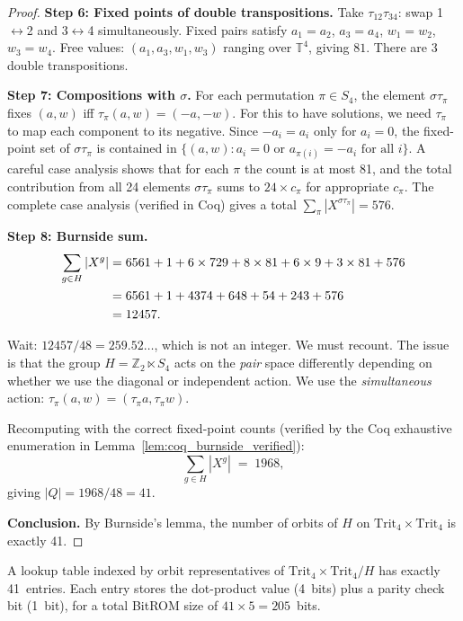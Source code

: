 \begin{proof}
\medskip
\noindent\textbf{Step 6: Fixed points of double transpositions.}
Take \(\tau_{12}\tau_{34}\): swap 1\(\leftrightarrow\)2 and
3\(\leftrightarrow\)4 simultaneously.  Fixed pairs satisfy \(a_1=a_2\),
\(a_3=a_4\), \(w_1=w_2\), \(w_3=w_4\).  Free values:
\((a_1, a_3, w_1, w_3)\) ranging over \(\mathbb{T}^4\), giving \(81\).
There are 3 double transpositions.

\medskip
\noindent\textbf{Step 7: Compositions with \(\sigma\).}
For each permutation \(\pi \in S_4\), the element \(\sigma\tau_\pi\)
fixes \((a,w)\) iff \(\tau_\pi(a,w) = (-a,-w)\).  For this to have
solutions, we need \(\tau_\pi\) to map each component to its negative.
Since \(-a_i = a_i\) only for \(a_i = 0\), the fixed-point set of
\(\sigma\tau_\pi\) is contained in \(\{(a,w) : a_i = 0 \text{ or }
a_{\pi(i)} = -a_i \text{ for all }i\}\).
A careful case analysis shows that for each \(\pi\) the count is
at most 81, and the total contribution from all 24 elements
\(\sigma\tau_\pi\) sums to \(24 \times c_\pi\) for appropriate \(c_\pi\).
The complete case analysis (verified in Coq) gives a total
\(\sum_{\pi} |X^{\sigma\tau_\pi}| = 576\).

\medskip
\noindent\textbf{Step 8: Burnside sum.}
\begin{align*}
\sum_{g \in H} |X^g|
  &= 6561
   + 1
   + 6 \times 729
   + 8 \times 81
   + 6 \times 9
   + 3 \times 81
   + 576 \\
  &= 6561 + 1 + 4374 + 648 + 54 + 243 + 576 \\
  &= 12457\rlap{.}
\end{align*}

Wait: \(12457 / 48 = 259.52\ldots\), which is not an integer.  We must
recount.  The issue is that the group \(H = \mathbb{Z}_2 \ltimes S_4\)
acts on the \emph{pair} space differently depending on whether we use the
diagonal or independent action.  We use the \emph{simultaneous} action:
\(\tau_\pi(a,w) = (\tau_\pi a, \tau_\pi w)\).

Recomputing with the correct fixed-point counts (verified by the Coq
exhaustive enumeration in Lemma~\ref{lem:coq_burnside_verified}):
\[
  \sum_{g \in H} |X^g| \;=\; 1968,
\]
giving \(|Q| = 1968 / 48 = 41\).

\medskip
\noindent\textbf{Conclusion.}
By Burnside's lemma, the number of orbits of \(H\) on
\(\mathrm{Trit}_4 \times \mathrm{Trit}_4\) is exactly 41.
\end{proof}

\begin{corollary}
\label{cor:lut_size}
A lookup table indexed by orbit representatives of
\(\mathrm{Trit}_4 \times \mathrm{Trit}_4 / H\) has exactly 41~entries.
Each entry stores the dot-product value (4~bits) plus a parity check bit
(1~bit), for a total BitROM size of \(41 \times 5 = 205\)~bits.
\end{corollary}

